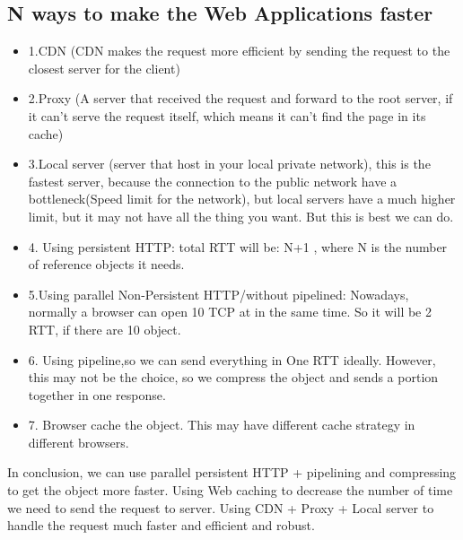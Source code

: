 \documentclass[fancy,11pt,titlestyle=display]{style/elegantbook}
\begin{document}
\subsection{N ways to make the Web Applications faster}
\begin{itemize}
\item 1.CDN (CDN makes the request more efficient by sending the request to the closest server for the client)
\item 2.Proxy (A server that received the request and forward to the root server, if it can't serve the request itself, which means it can't find the page in its cache)
\item 3.Local server (server that host in your local private network), this is the fastest server, because the connection to the public network have a bottleneck(Speed limit for the network), but local servers have a much higher limit, but it may not have all the thing you want. But this is best we can do.
\item 4. Using persistent HTTP:
total RTT will be: N+1 , where N is the number of reference objects it needs.
\item 5.Using parallel Non-Persistent HTTP/without pipelined: Nowadays, normally a browser can open 10 TCP at in the same time. So it will be 2 RTT, if there are 10 object.
\item 6. Using pipeline,so we can send everything in One RTT ideally. However, this may not be the choice, so we compress the object and sends a portion together in one response.
\item 7. Browser cache the object. This may have different cache strategy in different browsers.
\end{itemize}
\*
\par In conclusion, we can use parallel persistent HTTP + pipelining and compressing to get the object more faster. Using Web caching to decrease the number of time we need to send the request to server. Using CDN + Proxy + Local server to handle the request much faster and efficient and robust.
\end{document}

